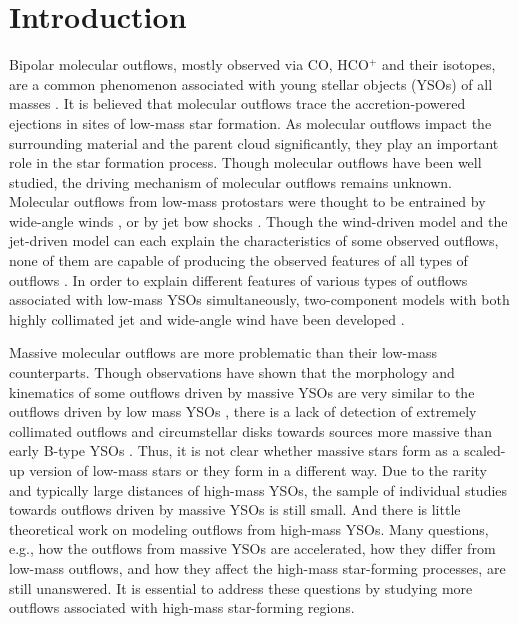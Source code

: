\section{Introduction}
Bipolar molecular outflows, mostly observed via CO, HCO$^+$ and their isotopes, are a common phenomenon associated with young stellar objects (YSOs) of all masses \citep{2001ApJ...552L.167Z, 2002A&A...383..892B, 2004A&A...426..503W, 2005AJ....129..330W,  2015MNRAS.453..645M}. It is believed that molecular outflows trace the accretion-powered ejections in sites of low-mass star formation. As molecular outflows impact the surrounding material and the parent cloud significantly, they play an important role in the star formation process. Though molecular outflows have been well studied, the driving mechanism of molecular outflows remains unknown. Molecular outflows from low-mass protostars were thought to be entrained by wide-angle winds \citep{1991ApJ...370L..31S, 2001ApJ...557..429L}, or by jet bow shocks \citep{ 1993A&A...278..267R, 1993ApJ...414..230M, 2001ApJ...557..429L}. Though the wind-driven model and the jet-driven model can each explain the characteristics of some observed outflows, none of them are capable of producing the observed features of all types of outflows \citep{2000ApJ...542..925L, 2002ApJ...576..294L}. In order to explain different features of various types of outflows associated with low-mass YSOs simultaneously, two-component models with both highly collimated jet and wide-angle wind have been developed \citep{2000prpl.conf..789S, 2006ApJ...641..949B, 2006MNRAS.365.1131P, 2006ApJ...649..845S, 2007prpl.conf..277P, 2008ApJ...676.1088M}.

Massive molecular outflows are more problematic than their low-mass counterparts. Though observations have shown that the morphology and kinematics of some outflows driven by massive YSOs are very similar to the outflows driven by low mass YSOs \citep[][]{1998ApJ...507..861S, 2002A&A...387..931B, 2009ApJ...696...66Q, 2011MNRAS.415L..49R}, there is a lack of detection of extremely collimated outflows and circumstellar disks towards sources more massive than early B-type YSOs \citep{2007prpl.conf..245A}. Thus, it is not clear whether massive stars form as a scaled-up version of low-mass stars or they form in a different way. Due to the rarity and typically large distances of high-mass YSOs, the sample of individual studies towards outflows driven by massive YSOs is still small. And there is little theoretical work on modeling outflows from high-mass YSOs. Many questions, e.g., how the outflows from massive YSOs are accelerated, how they differ from low-mass outflows, and how they affect the high-mass star-forming processes, are still unanswered. It is essential to address these questions by studying more outflows associated with high-mass star-forming regions. 

